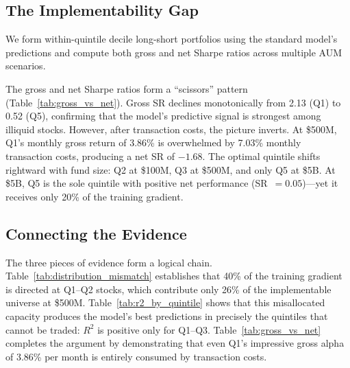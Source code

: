 \documentclass[a4paper,12pt,final]{article}
\begin{document}
\subsection{The Implementability Gap}
\label{subsec:implementability_gap}

We form within-quintile decile long-short portfolios using the standard model's predictions and compute both gross and net Sharpe ratios across multiple AUM scenarios.



The gross and net Sharpe ratios form a ``scissors'' pattern (Table~\ref{tab:gross_vs_net}). Gross SR declines monotonically from 2.13 (Q1) to 0.52 (Q5), confirming that the model's predictive signal is strongest among illiquid stocks. However, after transaction costs, the picture inverts. At \$500M, Q1's monthly gross return of 3.86\% is overwhelmed by 7.03\% monthly transaction costs, producing a net SR of $-1.68$. The optimal quintile shifts rightward with fund size: Q2 at \$100M, Q3 at \$500M, and only Q5 at \$5B. At \$5B, Q5 is the sole quintile with positive net performance (SR~$= 0.05$)---yet it receives only 20\% of the training gradient.


\subsection{Connecting the Evidence}
\label{subsec:connecting}

The three pieces of evidence form a logical chain. Table~\ref{tab:distribution_mismatch} establishes that 40\% of the training gradient is directed at Q1--Q2 stocks, which contribute only 26\% of the implementable universe at \$500M. Table~\ref{tab:r2_by_quintile} shows that this misallocated capacity produces the model's best predictions in precisely the quintiles that cannot be traded: $R^2$ is positive only for Q1--Q3. Table~\ref{tab:gross_vs_net} completes the argument by demonstrating that even Q1's impressive gross alpha of 3.86\% per month is entirely consumed by transaction costs.
\end{document}
